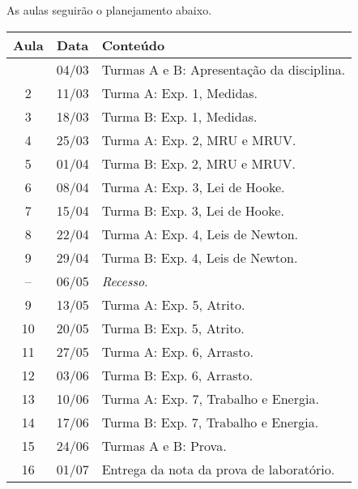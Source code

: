As aulas seguirão o planejamento abaixo.
\begin{center}
\begin{longtable}{ccp{70mm}}
\toprule
Aula & Data & Conteúdo \\
\midrule
\endhead
\bottomrule
\endfoot
 1 & 04/03 & Turmas A e B: Apresentação da disciplina. \\
 2 & 11/03 & Turma A: Exp. 1, Medidas. \\
 3 & 18/03 & Turma B: Exp. 1, Medidas. \\
 4 & 25/03 & Turma A: Exp. 2, MRU e MRUV. \\ 
 5 & 01/04 & Turma B: Exp. 2, MRU e MRUV. \\
 6 & 08/04 & Turma A: Exp. 3, Lei de Hooke. \\
 7 & 15/04 & Turma B: Exp. 3, Lei de Hooke. \\
 8 & 22/04 & Turma A: Exp. 4, Leis de Newton. \\
 9 & 29/04 & Turma B: Exp. 4, Leis de Newton. \\
-- & 06/05 & \emph{Recesso}. \\
 9 & 13/05 & Turma A: Exp. 5, Atrito. \\
10 & 20/05 & Turma B: Exp. 5, Atrito. \\
11 & 27/05 & Turma A: Exp. 6, Arrasto. \\
12 & 03/06 & Turma B: Exp. 6, Arrasto. \\
13 & 10/06 & Turma A: Exp. 7, Trabalho e Energia. \\
14 & 17/06 & Turma B: Exp. 7, Trabalho e Energia. \\
15 & 24/06 & Turmas A e B: Prova. \\
16 & 01/07 & Entrega da nota da prova de laboratório. \\
\end{longtable}
\end{center}

\cleardoublepage
